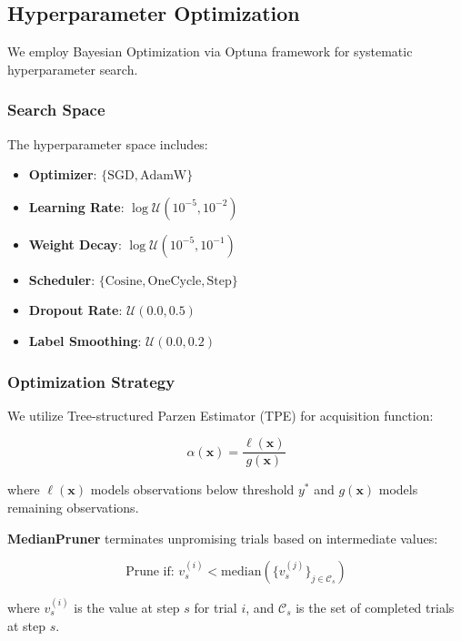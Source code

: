\subsection{Hyperparameter Optimization}

We employ Bayesian Optimization via Optuna framework for systematic hyperparameter search.

\subsubsection{Search Space}

The hyperparameter space includes:

\begin{itemize}
    \item \textbf{Optimizer}: $\{\text{SGD}, \text{AdamW}\}$
    \item \textbf{Learning Rate}: $\log \mathcal{U}(10^{-5}, 10^{-2})$
    \item \textbf{Weight Decay}: $\log \mathcal{U}(10^{-5}, 10^{-1})$
    \item \textbf{Scheduler}: $\{\text{Cosine}, \text{OneCycle}, \text{Step}\}$
    \item \textbf{Dropout Rate}: $\mathcal{U}(0.0, 0.5)$
    \item \textbf{Label Smoothing}: $\mathcal{U}(0.0, 0.2)$
\end{itemize}

\subsubsection{Optimization Strategy}

We utilize Tree-structured Parzen Estimator (TPE) for acquisition function:

\begin{equation}
\alpha(\boldsymbol{x}) = \frac{\ell(\boldsymbol{x})}{g(\boldsymbol{x})}
\end{equation}

where $\ell(\boldsymbol{x})$ models observations below threshold $y^*$ and $g(\boldsymbol{x})$ models remaining observations.

\textbf{MedianPruner} terminates unpromising trials based on intermediate values:

\begin{equation}
\text{Prune if: } v_s^{(i)} < \text{median}(\{v_s^{(j)}\}_{j \in \mathcal{C}_s})
\end{equation}

where $v_s^{(i)}$ is the value at step $s$ for trial $i$, and $\mathcal{C}_s$ is the set of completed trials at step $s$.

